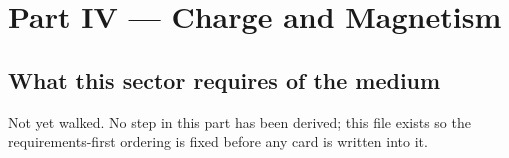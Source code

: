 \part{Part IV --- Charge and Magnetism}

\chapter{What this sector requires of the medium}

Not yet walked. No step in this part has been derived; this file exists so the
requirements-first ordering is fixed before any card is written into it.
